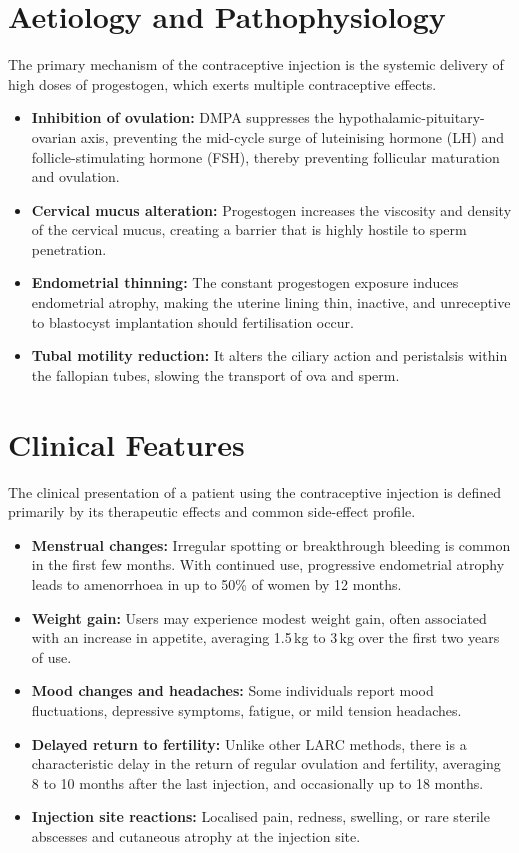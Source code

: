 \section*{Aetiology and Pathophysiology}
The primary mechanism of the contraceptive injection is the systemic delivery of high doses of progestogen, which exerts multiple contraceptive effects.
\begin{itemize}
    \item \textbf{Inhibition of ovulation:} DMPA suppresses the hypothalamic-pituitary-ovarian axis, preventing the mid-cycle surge of luteinising hormone (LH) and follicle-stimulating hormone (FSH), thereby preventing follicular maturation and ovulation.
    \item \textbf{Cervical mucus alteration:} Progestogen increases the viscosity and density of the cervical mucus, creating a barrier that is highly hostile to sperm penetration.
    \item \textbf{Endometrial thinning:} The constant progestogen exposure induces endometrial atrophy, making the uterine lining thin, inactive, and unreceptive to blastocyst implantation should fertilisation occur.
    \item \textbf{Tubal motility reduction:} It alters the ciliary action and peristalsis within the fallopian tubes, slowing the transport of ova and sperm.
\end{itemize}

\section*{Clinical Features}
The clinical presentation of a patient using the contraceptive injection is defined primarily by its therapeutic effects and common side-effect profile.
\begin{itemize}
    \item \textbf{Menstrual changes:} Irregular spotting or breakthrough bleeding is common in the first few months. With continued use, progressive endometrial atrophy leads to amenorrhoea in up to 50\% of women by 12 months.
    \item \textbf{Weight gain:} Users may experience modest weight gain, often associated with an increase in appetite, averaging 1.5\,kg to 3\,kg over the first two years of use.
    \item \textbf{Mood changes and headaches:} Some individuals report mood fluctuations, depressive symptoms, fatigue, or mild tension headaches.
    \item \textbf{Delayed return to fertility:} Unlike other LARC methods, there is a characteristic delay in the return of regular ovulation and fertility, averaging 8 to 10 months after the last injection, and occasionally up to 18 months.
    \item \textbf{Injection site reactions:} Localised pain, redness, swelling, or rare sterile abscesses and cutaneous atrophy at the injection site.
\end{itemize}

